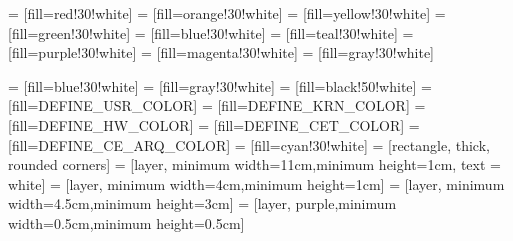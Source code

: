 \usepackage{hyperref}
\usepackage{listings}
\usepackage{color}
\usepackage[dvipsnames]{xcolor}
\usepackage{float}
\usepackage{graphicx}
\usepackage{tikz,tikz-dependency}
\usepackage{ifthen}
\usetikzlibrary{calc}
\usetikzlibrary{automata,positioning,external,shapes,arrows,chains,matrix,scopes,backgrounds}
\usepackage{enumerate}
\makeatletter
{}
\makeatother

\makeatletter
\renewcommand\thesection{}
\renewcommand\thesubsection{}
\makeatother

     = [fill=red!30!white]
  = [fill=orange!30!white]
  = [fill=yellow!30!white]
   = [fill=green!30!white]
    = [fill=blue!30!white]
    = [fill=teal!30!white]
  = [fill=purple!30!white]
 = [fill=magenta!30!white]
    = [fill=gray!30!white]


  = [fill=blue!30!white]
 = [fill=gray!30!white]
  = [fill=black!50!white]
 = [fill=DEFINE_USR_COLOR]
 = [fill=DEFINE_KRN_COLOR]
  = [fill=DEFINE_HW_COLOR]
 = [fill=DEFINE_CET_COLOR]
 = [fill=DEFINE_CE_ARQ_COLOR]
  = [fill=cyan!30!white]
      = [rectangle, thick, rounded corners]
 = [layer, minimum width=11cm,minimum height=1cm, text = white]
 = [layer, minimum width=4cm,minimum height=1cm]
  = [layer, minimum width=4.5cm,minimum height=3cm]
  = [layer, purple,minimum width=0.5cm,minimum height=0.5cm]

